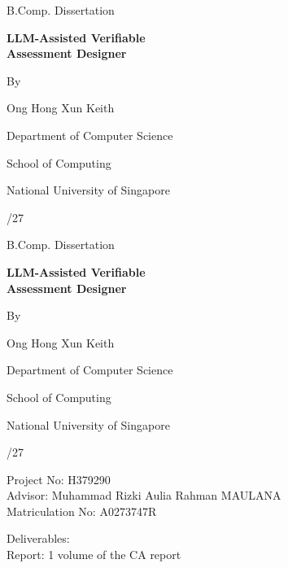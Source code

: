 \begin{titlepage}
\centering
\vspace*{0.8cm}
{\large B.Comp. Dissertation\par}
\vspace{2.2cm}
{\fontsize{18}{23}\selectfont\bfseries
LLM-Assisted Verifiable\\Assessment Designer\par}
\vspace{2cm}
By\par
\medskip
Ong Hong Xun Keith\par
\vfill
Department of Computer Science\par
School of Computing\par
National University of Singapore\par
{}/27\par
\vspace*{1cm}
\end{titlepage}

\begin{titlepage}
\centering
\vspace*{0.4cm}
{\large B.Comp. Dissertation\par}
\vspace{1.6cm}
{\fontsize{18}{23}\selectfont\bfseries
LLM-Assisted Verifiable\\Assessment Designer\par}
\vspace{1.5cm}
By\par
\medskip
Ong Hong Xun Keith\par
\vspace{1.5cm}
Department of Computer Science\par
School of Computing\par
National University of Singapore\par
{}/27\par
\vfill
\begin{flushleft}
Project No: H379290\\[5pt]
Advisor: Muhammad Rizki Aulia Rahman MAULANA\\[5pt]
Matriculation No: A0273747R

\bigskip
Deliverables:\\[5pt]
Report: 1 volume of the CA report
\end{flushleft}
\vspace*{0.6cm}
\end{titlepage}
